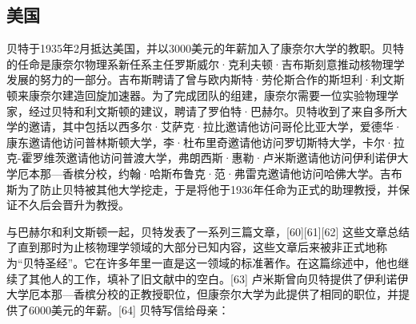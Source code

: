 \subsection{美国}  
贝特于1935年2月抵达美国，并以3000美元的年薪加入了康奈尔大学的教职。贝特的任命是康奈尔物理系新任系主任罗斯威尔·克利夫顿·吉布斯刻意推动核物理学发展的努力的一部分。吉布斯聘请了曾与欧内斯特·劳伦斯合作的斯坦利·利文斯顿来康奈尔建造回旋加速器。为了完成团队的组建，康奈尔需要一位实验物理学家，经过贝特和利文斯顿的建议，聘请了罗伯特·巴赫尔。贝特收到了来自多所大学的邀请，其中包括以西多尔·艾萨克·拉比邀请他访问哥伦比亚大学，爱德华·康东邀请他访问普林斯顿大学，李·杜布里奇邀请他访问罗切斯特大学，卡尔·拉克-霍罗维茨邀请他访问普渡大学，弗朗西斯·惠勒·卢米斯邀请他访问伊利诺伊大学厄本那—香槟分校，约翰·哈斯布鲁克·范·弗雷克邀请他访问哈佛大学。吉布斯为了防止贝特被其他大学挖走，于是将他于1936年任命为正式的助理教授，并保证不久后会晋升为教授。

与巴赫尔和利文斯顿一起，贝特发表了一系列三篇文章，[60][61][62] 这些文章总结了直到那时为止核物理学领域的大部分已知内容，这些文章后来被非正式地称为“贝特圣经”。它在许多年里一直是这一领域的标准著作。在这篇综述中，他也继续了其他人的工作，填补了旧文献中的空白。[63] 卢米斯曾向贝特提供了伊利诺伊大学厄本那—香槟分校的正教授职位，但康奈尔大学为此提供了相同的职位，并提供了6000美元的年薪。[64] 贝特写信给母亲：

